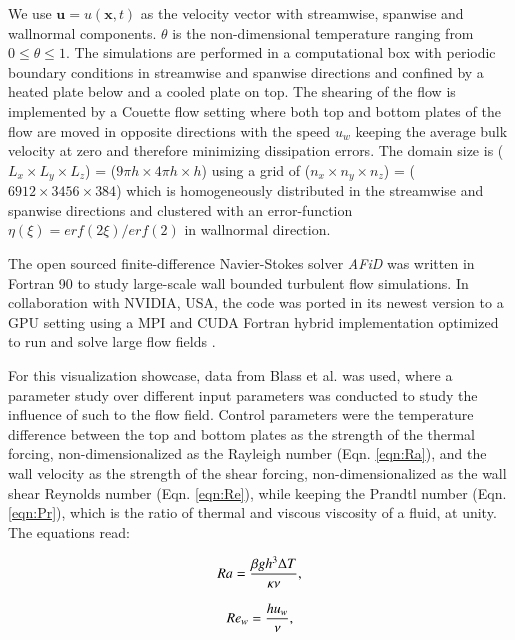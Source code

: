 \documentclass[final,5p,times,twocolumn]{elsarticle}
\begin{document}
We use $ \boldsymbol{u}=u(\boldsymbol{x},t) $ as the velocity vector with streamwise, spanwise and wallnormal components. $ \theta $ is the non-dimensional temperature ranging from $ 0 \leq \theta \leq 1 $. The simulations are performed in a computational box with periodic boundary conditions in streamwise and spanwise directions and confined by a heated plate below and a cooled plate on top. The shearing of the flow is implemented by a Couette flow setting where both top and bottom plates of the flow are moved in opposite directions with the speed $ u_w $ keeping the average bulk velocity at zero and therefore minimizing dissipation errors. The domain size is ($ L_x \times L_y \times L_z $) = ($ 9\pi h \times 4\pi h \times h $) using a grid of ($ n_x \times n_y \times n_z $) = ($ 6912 \times 3456 \times 384 $) which is homogeneously distributed in the streamwise and spanwise directions and clustered with an error-function $ \eta(\xi)=erf(2\xi)/erf(2) $ in wallnormal direction.

The open sourced finite-difference Navier-Stokes solver \textit{AFiD} \cite{poe15c} was written in Fortran 90 to study large-scale wall bounded turbulent flow simulations. In collaboration with NVIDIA, USA, the code was ported in its newest version to a GPU setting using a MPI and CUDA Fortran hybrid implementation optimized to run and solve large flow fields \cite{zhu18b}.

For this visualization showcase, data from Blass et al. \cite{bla18} was used, where a parameter study over different input parameters was conducted to study the influence of such to the flow field. Control parameters were the temperature difference between the top and bottom plates as the strength of the thermal forcing, non-dimensionalized as the Rayleigh number (Eqn. \ref{eqn:Ra}), and the wall velocity as the strength of the shear forcing, non-dimensionalized as the wall shear Reynolds number (Eqn. \ref{eqn:Re}), while keeping the Prandtl number (Eqn. \ref{eqn:Pr}), which is the ratio of thermal and viscous viscosity of a fluid, at unity. The equations read:

\begin{equation} %
Ra= \frac{\beta gh^3\Delta T}{\kappa\nu}, 
\label{eqn:Ra} \\[8pt]
\end{equation}

\begin{equation} %
Re_w= \frac{hu_w}{\nu},
\label{eqn:Re} \\[8pt]
\end{equation}
\end{document}
